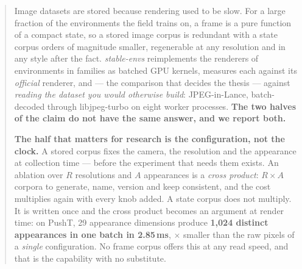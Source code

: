 \documentclass{article}
\begin{document}
\begin{abstract}
Image datasets are stored because rendering used to be slow. For a large
fraction of the environments the field trains on, a frame is a pure function of
a compact state, so a stored image corpus is redundant with a state corpus
orders of magnitude smaller, regenerable at any resolution and in any style
after the fact. \emph{stable-envs} reimplements the renderers of \seNenvs{}
environments in \seNfamilies{} families as batched GPU kernels, measures each
against its \emph{official} renderer, and --- the comparison that decides the
thesis --- against \emph{reading the dataset you would otherwise build}:
JPEG-in-Lance, batch-decoded through libjpeg-turbo on eight worker processes.
\textbf{The two halves of the claim do not have the same answer, and we report
both.}

\textbf{The half that matters for research is the configuration, not the
clock.} A stored corpus fixes the camera, the resolution and the appearance at
collection time --- before the experiment that needs them exists. An ablation
over $R$ resolutions and $A$ appearances is a \emph{cross product}: $R\!\times\!A$
corpora to generate, name, version and keep consistent, and the cost multiplies
again with every knob added. A state corpus does not multiply. It is written
once and the cross product becomes an argument at render time: on PushT, 29
appearance dimensions produce \textbf{1,024 distinct appearances in one batch
in 2.85\,ms}, \seStorageRatio$\times$ smaller than the raw pixels of a
\emph{single} configuration. No frame corpus offers this at any read speed,
and that is the capability with no substitute.


\end{abstract}
\end{document}
